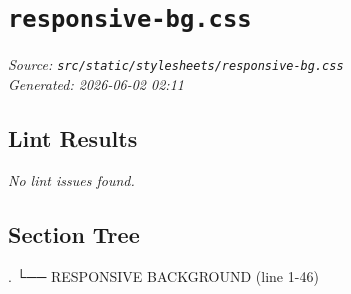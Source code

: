 
\section{\texttt{responsive-bg.css}}
\textit{Source: \texttt{src/static/stylesheets/responsive-bg.css}} \\
\textit{Generated: 2026-06-02 02:11} \\

\subsection{Lint Results}
\textit{No lint issues found.} \\

\subsection{Section Tree}
\begingroup
\linespread{0.9}\selectfont
\begin{verbnobox}[\FiraCode]
.
└── RESPONSIVE BACKGROUND  (line 1-46)
\end{verbnobox}
\endgroup
